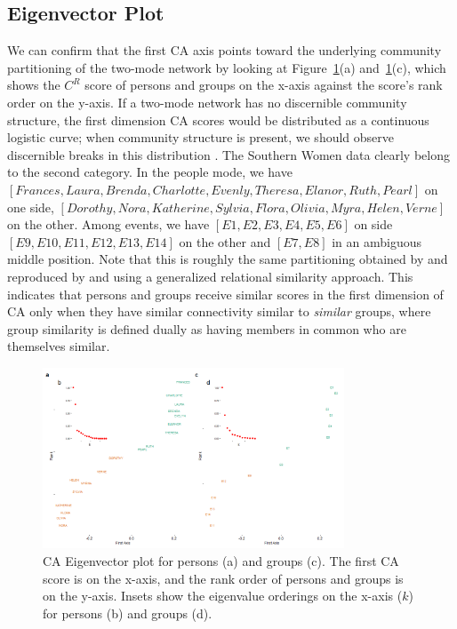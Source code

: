\documentclass[a4paper,fleqn]{cas-sc}
\begin{document}
\subsection{Eigenvector Plot} \label{subsec:eigplot}
We can confirm that the first CA axis points toward the underlying community partitioning of the two-mode network by looking at Figure~\ref{fig:ca-eigvec}(a) and~\ref{fig:ca-eigvec}(c), which shows the $C^R$ score of persons and groups on the x-axis against the score's rank order on the y-axis. If a two-mode network has no discernible community structure, the first dimension CA scores would be distributed as a continuous logistic curve; when community structure is present, we should observe discernible breaks in this distribution \citep{van2021correspondence}. The Southern Women data clearly belong to the second category. In the people mode, we have $\left[Frances, Laura, Brenda, Charlotte, Evenly, Theresa, Elanor, Ruth, Pearl\right]$ on one side, $\left[Dorothy, Nora, Katherine, Sylvia, Flora, Olivia, Myra, Helen, Verne\right]$ on the other. Among events, we have $\left[E1, E2, E3, E4, E5, E6\right]$ on side $\left[E9, E10, E11, E12, E13, E14\right]$ on the other and $\left[E7, E8\right]$ in an ambiguous middle position. Note that this is roughly the same partitioning obtained by \citep{doreian2004generalized} and reproduced by \citet{kovacs2010generalized} and \citet{lizardo2024two} using a generalized relational similarity approach. This indicates that persons and groups receive similar scores in the first dimension of CA only when they have similar connectivity similar to \textit{similar} groups, where group similarity is defined dually as having members in common who are themselves similar. 

\begin{figure}
    \centering
    \includegraphics[width=0.8\textwidth]{Plots/ca-eigvec.png}
    \caption{CA Eigenvector plot for persons (a) and groups (c). The first CA score is on the x-axis, and the rank order of persons and groups is on the y-axis. Insets show the eigenvalue orderings on the x-axis ($k$) for persons (b) and groups (d).}
    \label{fig:ca-eigvec}
\end{figure}
\end{document}
